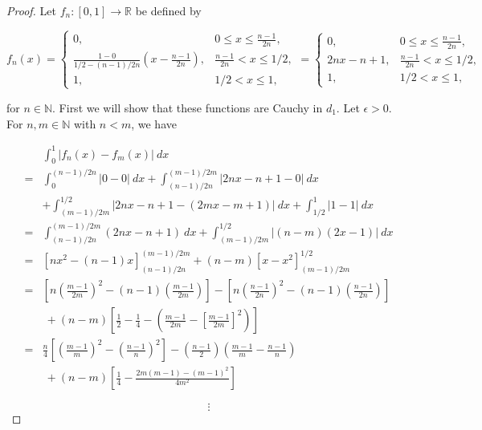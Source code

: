 \begin{proof}

Let \(f_n: [0,1] \to \mathbb{R}\) be defined by

\[
f_n(x) = \begin{cases}
0, & 0 \leq x \leq \frac{n -1}{2n}, \\
\frac{1 - 0 }{1/2 - (n-1)/2n}\left( x - \frac{n-1}{2n} \right), & \frac{n -1}{2n} < x \leq 1/2, \\
1, & 1/2 < x \leq 1,
\end{cases} = \begin{cases}
0, & 0 \leq x \leq \frac{n -1}{2n}, \\
2n  x - n + 1, & \frac{n -1}{2n} < x \leq 1/2, \\
1, & 1/2 < x \leq 1,
\end{cases}
\]

for \(n \in \mathbb{N}\). First we will show that these functions are Cauchy in \(d_1\). Let \(\epsilon > 0\). For \(n, m \in \mathbb{N}\) with \(n < m\), we have 

\begin{align*}
& \int_0^1 | f_n(x) - f_m(x) | \ dx 
\\ = & \int_0^{(n-1)/2n}  | 0 - 0  | \ dx  + \int_{(n-1)/2n} ^{(m-1)/2m}   | 2n  x - n + 1 - 0  | \ dx 
\\ & + \int_{(m-1)/2m} ^{1/2}  | 2n  x - n + 1 - (2m  x - m + 1) | \ dx 
 + \int_{1/2}^1  | 1- 1  | \ dx
\\ = & \int_{(n-1)/2n} ^{(m-1)/2m}  ( 2n  x - n + 1 ) \ dx  + \int_{(m-1)/2m} ^{1/2}  | (n - m)  (2x - 1) | \ dx  
\\ = &  \left[ n  x^2 - (n-1)x \right]_{(n-1)/2n} ^{(m-1)/2m}   + (n - m)   \left[ x - x^2 \right]_{(m-1)/2m} ^{1/2}  
\\ = &  \left[ n  \left(\frac{m-1}{2m} \right) ^2 - (n-1)\left(\frac{m-1}{2m} \right) \right] - \left[ n  \left(\frac{n-1}{2n} \right) ^2 - (n-1)\left(\frac{n-1}{2n} \right) \right] 
\\ & \ + (n - m)   \left[ \frac{1}{2} - \frac{1}{4} - \left(\frac{m-1}{2m}  - \left[ \frac{m-1}{2m}  \right]^2 \right)  \right] 
\\ = &  \frac{n}{4} \left[ \left( \frac{m-1}{m} \right )^2 - \left( \frac{n-1}{n} \right )^2\right]   -  \left( \frac{n-1}{2} \right) \left( \frac{m - 1}{m} -  \frac{n-1}{n} \right)
\\ & \ + (n - m)   \left[  \frac{1}{4} - \frac{ 2m(m-1) - (m-1)^2}{4m^2}   \right] 
\end{align*}

\[
\vdots
\]

\end{proof}

